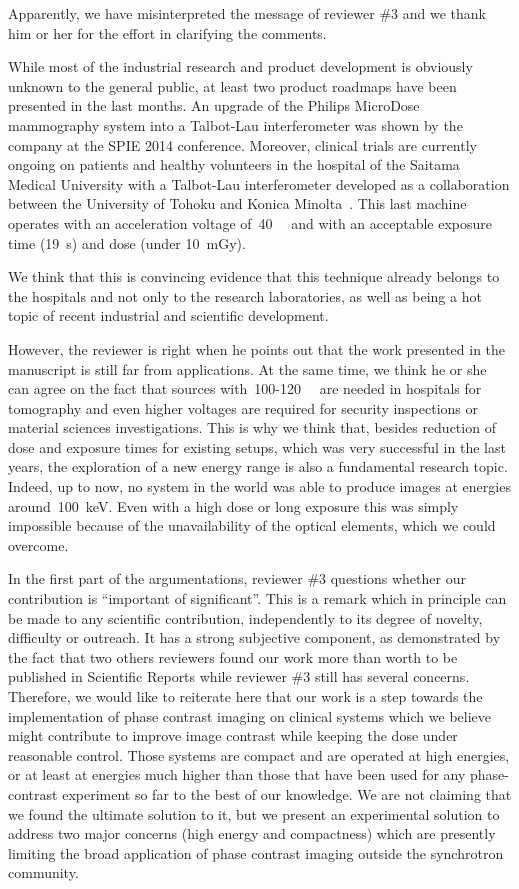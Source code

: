 \documentclass[a4paper,english]{scrartcl}
\begin{document}
Apparently, we have misinterpreted the message of reviewer \#3
and we thank him or her for the effort in clarifying the comments.


While most of the industrial research and product development is obviously
unknown to the general public, at least two product roadmaps have been presented in
the last months. An upgrade of the Philips MicroDose mammography system into a
Talbot-Lau interferometer was shown by the company at the SPIE
2014 conference\cite{Roessl2014,Roessl06032014}. Moreover, clinical trials are currently
ongoing on patients and healthy volunteers in the hospital of the Saitama
Medical University with a Talbot-Lau interferometer
developed as a collaboration between the University of Tohoku and Konica
Minolta~\cite{Momose06032014}. This last machine operates with an
acceleration voltage of~\SI{40}{\kilo\voltpeak} and with an acceptable
exposure time (\SI{19}{\second}) and dose (under \SI{10}{\milli\gray}).

We think that this is convincing evidence that this technique already belongs to the
hospitals and not only to the research laboratories, as well as being a hot
topic of recent industrial and scientific development.

However, the reviewer is right when he points out that the work presented in
the manuscript is still far from applications. At the same time, we think he
or she can agree on the fact that sources
with~\num{100}-\SI{120}{\kilo\voltpeak} are needed in
hospitals for tomography and even higher voltages are required for security
inspections or material sciences investigations.
This is why we think that, besides reduction of dose and exposure times for
existing setups, which was very successful in the last years, the
exploration of a new energy range is also a fundamental
research topic. Indeed, up to now, no system in the world was able to
produce images at energies around~\SI{100}{\kilo\eV}. Even with a high
dose or long exposure
this was simply impossible because of the unavailability of the optical
elements, which we could overcome.

In the first part of the argumentations, reviewer \#3 questions whether our
contribution is ``important of significant''. This is a remark which in
principle can be made to any scientific contribution, independently to its
degree of novelty, difficulty or outreach. It has a strong subjective
component, as demonstrated by the fact that two others reviewers found our
work more than worth to be published in Scientific Reports while reviewer \#3 still has
several concerns. Therefore, we would like to reiterate here that our work
is a step towards the implementation of phase contrast imaging on clinical
systems which we believe might contribute to improve image contrast while
keeping the dose under reasonable control. Those systems are compact and are
operated at high energies, or at least at energies much higher than those
that have been used for any phase-contrast experiment so far to the best of
our knowledge. We are not claiming that we found the ultimate solution to
it, but we present an experimental solution to address two major concerns
(high energy and compactness) which are presently limiting the broad
application of phase contrast imaging outside the synchrotron community.
\end{document}
